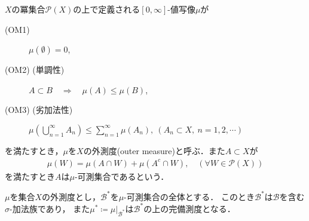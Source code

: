 		\begin{screen}
			\begin{dfn}[外測度]\label{def:outer_measure}
				$X$の冪集合$\mathcal{P}(X)$の上で定義される$[0,\infty]$-値写像$\mu$が
				\begin{description}
					\item[(OM1)] $\mu(\emptyset) = 0$,
					\item[(OM2) (単調性)] $A \subset B \quad \Longrightarrow \quad \mu(A) \leq \mu(B)$,
					\item[(OM3) (劣加法性)] $\mu\left( \bigcup_{n=1}^\infty A_n \right) \leq \sum_{n=1}^\infty \mu(A_n),\ (A_n \subset X,\ n=1,2,\cdots)$
				\end{description}
				を満たすとき，$\mu$を$X$の外測度(outer measure)と呼ぶ．また$A \subset X$が
				\begin{align}
					\mu(W) = \mu(A \cap W) + \mu(A^c \cap W), \quad (\forall W \in \mathcal{P}(X))
				\end{align}
				を満たすとき$A$は$\mu$-可測集合であるという．
			\end{dfn}
		\end{screen}
		
		\begin{screen}
			\begin{thm}[Caratheodoryの拡張定理]\label{thm:Caratheodory_extension_theorem}
				$\mu$を集合$X$の外測度とし，$\mathcal{B}^*$を$\mu$-可測集合の全体とする．
				このとき$\mathcal{B}^*$は$\mathcal{B}$を含む$\sigma$-加法族であり，
				また$\mu^* \coloneqq \left. \mu \right|_{\mathcal{B}^*}$は$\mathcal{B}^*$の上の完備測度となる．
			\end{thm}
		\end{screen}
		
